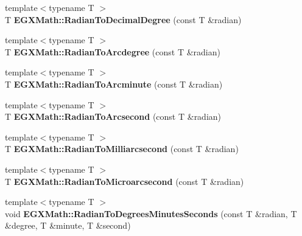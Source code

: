 \begin{DoxyCompactItemize}
{\footnotesize template$<$typename T $>$ }\\T {\bfseries E\+G\+X\+Math\+::\+Radian\+To\+Decimal\+Degree} (const T \&radian)
\item 
\mbox{\label{group___e_g_x_math-_angle_conversions_ga3dfdc97357cc07f8379976bbc08f9852}} 
{\footnotesize template$<$typename T $>$ }\\T {\bfseries E\+G\+X\+Math\+::\+Radian\+To\+Arcdegree} (const T \&radian)
\item 
\mbox{\label{group___e_g_x_math-_angle_conversions_ga722e3b8e78540a6b3942b73b64aeb8d2}} 
{\footnotesize template$<$typename T $>$ }\\T {\bfseries E\+G\+X\+Math\+::\+Radian\+To\+Arcminute} (const T \&radian)
\item 
\mbox{\label{group___e_g_x_math-_angle_conversions_ga2f952f6675a0fc54bf72bfe4e3d2664a}} 
{\footnotesize template$<$typename T $>$ }\\T {\bfseries E\+G\+X\+Math\+::\+Radian\+To\+Arcsecond} (const T \&radian)
\item 
\mbox{\label{group___e_g_x_math-_angle_conversions_ga84fbb494a455cfeb30be62776f96c9a9}} 
{\footnotesize template$<$typename T $>$ }\\T {\bfseries E\+G\+X\+Math\+::\+Radian\+To\+Milliarcsecond} (const T \&radian)
\item 
\mbox{\label{group___e_g_x_math-_angle_conversions_ga3a515ca2838a305fa40750763f546a86}} 
{\footnotesize template$<$typename T $>$ }\\T {\bfseries E\+G\+X\+Math\+::\+Radian\+To\+Microarcsecond} (const T \&radian)
\item 
\mbox{\label{group___e_g_x_math-_angle_conversions_ga1013b63f441961f3d6ee9b88536f74fc}} 
{\footnotesize template$<$typename T $>$ }\\void {\bfseries E\+G\+X\+Math\+::\+Radian\+To\+Degrees\+Minutes\+Seconds} (const T \&radian, T \&degree, T \&minute, T \&second)
\item 
\mbox{\label{group___e_g_x_math-_angle_conversions_ga5e0b805d236e6215ff1e60426ca22dc0}} 

\end{DoxyCompactItemize}
